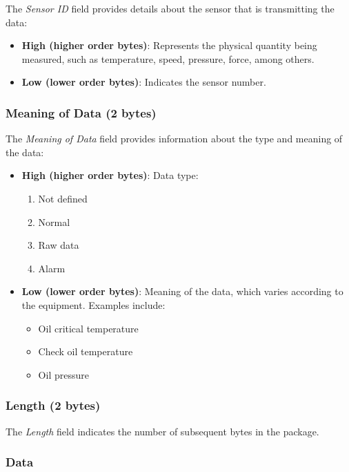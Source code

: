 The \textit{Sensor ID} field provides details about the sensor that is transmitting the data:

\begin{itemize}
    \item \textbf{High (higher order bytes)}: Represents the physical quantity being measured, such as temperature, speed, pressure, force, among others.
    \item \textbf{Low (lower order bytes)}: Indicates the sensor number.
\end{itemize}\subsubsection{Meaning of Data (2 bytes)}

The \textit{Meaning of Data} field provides information about the type and meaning of the data:

\begin{itemize}
    \item \textbf{High (higher order bytes)}: Data type:
    \begin{enumerate}
        \item Not defined
        \item Normal
        \item Raw data
        \item Alarm
    \end{enumerate}
    \item \textbf{Low (lower order bytes)}: Meaning of the data, which varies according to the equipment. Examples include:
    \begin{itemize}
        \item Oil critical temperature
        \item Check oil temperature
        \item Oil pressure
\end{itemize}
\end{itemize}

\subsubsection{Length (2 bytes)}

The \textit{Length} field indicates the number of subsequent bytes in the package.

\subsubsection{Data}

